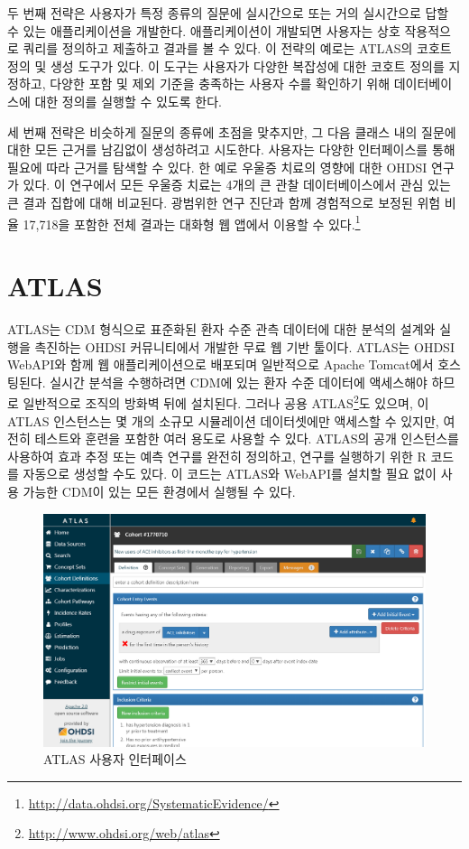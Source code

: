 \documentclass[11pt]{book}
\let\rmarkdownfootnote\footnote%
\def\footnote{\protect\rmarkdownfootnote}
\theoremstyle{definition}
\theoremstyle{definition}
\theoremstyle{definition}
\theoremstyle{remark}
\begin{document}
두 번째 전략은 사용자가 특정 종류의 질문에 실시간으로 또는 거의
실시간으로 답할 수 있는 애플리케이션을 개발한다. 애플리케이션이 개발되면
사용자는 상호 작용적으로 쿼리를 정의하고 제출하고 결과를 볼 수 있다. 이
전략의 예로는 ATLAS의 코호트 정의 및 생성 도구가 있다. 이 도구는
사용자가 다양한 복잡성에 대한 코호트 정의를 지정하고, 다양한 포함 및
제외 기준을 충족하는 사용자 수를 확인하기 위해 데이터베이스에 대한
정의를 실행할 수 있도록 한다.

세 번째 전략은 비슷하게 질문의 종류에 초점을 맞추지만, 그 다음 클래스
내의 질문에 대한 모든 근거를 남김없이 생성하려고 시도한다. 사용자는
다양한 인터페이스를 통해 필요에 따라 근거를 탐색할 수 있다. 한 예로
우울증 치료의 영향에 대한 OHDSI 연구가 있다. \citep{schuemie_2018b} 이
연구에서 모든 우울증 치료는 4개의 큰 관찰 데이터베이스에서 관심 있는 큰
결과 집합에 대해 비교된다. 광범위한 연구 진단과 함께 경험적으로 보정된
위험 비율 17,718을 포함한 전체 결과는 대화형 웹 앱에서 이용할 수
있다.\footnote{\url{http://data.ohdsi.org/SystematicEvidence/}}

\section{ATLAS}\label{atlas}

ATLAS는 CDM 형식으로 표준화된 환자 수준 관측 데이터에 대한 분석의 설계와
실행을 촉진하는 OHDSI 커뮤니티에서 개발한 무료 웹 기반 툴이다. ATLAS는
OHDSI WebAPI와 함께 웹 애플리케이션으로 배포되며 일반적으로 Apache
Tomcat에서 호스팅된다. 실시간 분석을 수행하려면 CDM에 있는 환자 수준
데이터에 액세스해야 하므로 일반적으로 조직의 방화벽 뒤에 설치된다.
그러나 공용 ATLAS\footnote{\url{http://www.ohdsi.org/web/atlas}}도
있으며, 이 ATLAS 인스턴스는 몇 개의 소규모 시뮬레이션 데이터셋에만
액세스할 수 있지만, 여전히 테스트와 훈련을 포함한 여러 용도로 사용할 수
있다. ATLAS의 공개 인스턴스를 사용하여 효과 추정 또는 예측 연구를 완전히
정의하고, 연구를 실행하기 위한 R 코드를 자동으로 생성할 수도 있다. 이
코드는 ATLAS와 WebAPI를 설치할 필요 없이 사용 가능한 CDM이 있는 모든
환경에서 실행될 수 있다. 

\begin{figure}

{\centering \includegraphics[width=1\linewidth]{images/OhdsiAnalyticsTools/atlas} 

}

\caption{ATLAS 사용자 인터페이스}\label{fig:atlas}
\end{figure}
\end{document}
